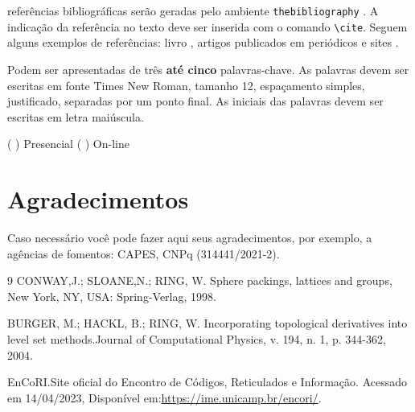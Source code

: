 \documentclass{semat}
\begin{document}
referências bibliográficas serão geradas pelo ambiente \verb+thebibliography+ . A indicação da referência no texto deve ser inserida com o comando \verb+\cite+. Seguem alguns exemplos de referências: livro \cite{conway2013sphere}, artigos publicados em periódicos \cite{burger2004derivatives} e sites \cite{EnCoRI}. 

\vspace{1.5em}

 Podem ser apresentadas de três \textbf{até cinco} palavras-chave. As palavras devem ser escritas em fonte Times New Roman, tamanho 12, espaçamento simples, justificado, separadas por um ponto final. As iniciais das palavras devem ser escritas em letra maiúscula.
\vspace{1.5em}

 ( ) Presencial  ( ) On-line

\vspace{1.5em}

\section*{Agradecimentos} %
Caso necessário você pode fazer aqui seus agradecimentos, por exemplo, a agências de fomentos: CAPES, CNPq (314441/2021-2).



\begin{thebibliography}{9}
CONWAY,J.; SLOANE,N.; RING, W. 
Sphere packings, lattices and groups,
  New York, NY, USA: Spring-Verlag, 1998.

BURGER, M.; HACKL, B.; RING, W. Incorporating topological derivatives into level set methods.Journal of Computational Physics, v. 194, n. 1, p. 344-362, 2004.

  EnCoRI.Site oficial do Encontro de Códigos, Reticulados e Informação. Acessado em 14/04/2023, Disponível em:\url{https://ime.unicamp.br/encori/}.
\end{thebibliography}
\end{document}

